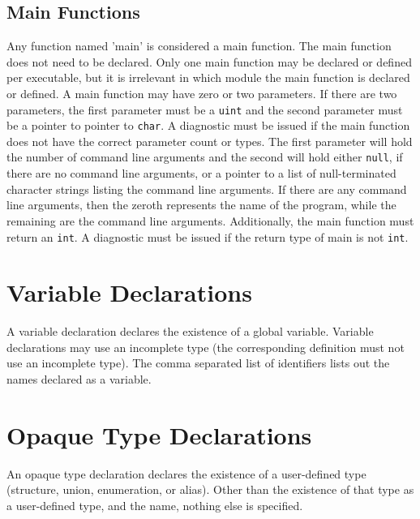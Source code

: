 \documentclass[letterpaper,12pt]{book}
\begin{document}
\subsection{Main Functions}

Any function named 'main' is considered a main function. The main function does not need to be declared. Only one main function may be declared or defined per executable, but it is irrelevant in which module the main function is declared or defined. A main function may have zero or two parameters. If there are two parameters, the first parameter must be a \texttt{uint} and the second parameter must be a pointer to pointer to \texttt{char}. A diagnostic must be issued if the main function does not have the correct parameter count or types. The first parameter will hold the number of command line arguments and the second will hold either \texttt{null}, if there are no command line arguments, or a pointer to a list of null-terminated character strings listing the command line arguments. If there are any command line arguments, then the zeroth represents the name of the program, while the remaining are the command line arguments. Additionally, the main function must return an \texttt{int}. A diagnostic must be issued if the return type of main is not \texttt{int}.

\section{Variable Declarations}



A variable declaration declares the existence of a global variable. Variable declarations may use an incomplete type (the corresponding definition must not use an incomplete type). The comma separated list of identifiers lists out the names declared as a variable.

\section{Opaque Type Declarations}



An opaque type declaration declares the existence of a user-defined type (structure, union, enumeration, or alias). Other than the existence of that type as a user-defined type, and the name, nothing else is specified.
\end{document}
